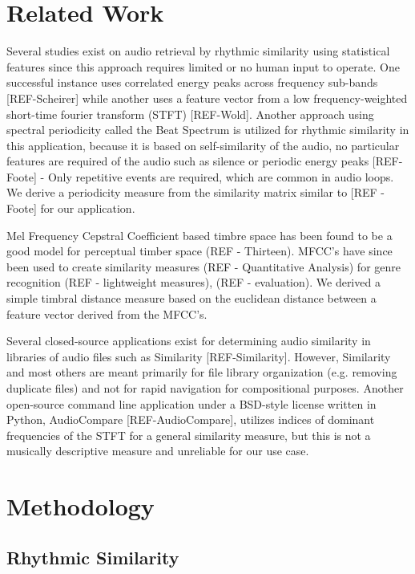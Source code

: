 \documentclass{article}
\begin{document}
\section{Related Work}

Several studies exist on audio retrieval by rhythmic similarity using statistical features since this approach requires limited or no human input to operate. One successful instance uses correlated energy peaks across frequency sub-bands [REF-Scheirer]  while another uses a feature vector from a low frequency-weighted short-time fourier transform (STFT) [REF-Wold]. Another approach using spectral periodicity called the Beat Spectrum is utilized for rhythmic similarity in this application, because it is based on self-similarity of the audio, no particular features are required of the audio such as silence or periodic energy peaks [REF-Foote] - Only repetitive events are required, which are common in audio loops. We derive a periodicity measure from the similarity matrix similar to [REF - Foote] for our application.

Mel Frequency Cepstral Coefficient based timbre space has been found to be a good model for perceptual timber space (REF - Thirteen). MFCC’s have since been used to create similarity measures (REF - Quantitative Analysis) for genre recognition (REF -  lightweight measures), (REF - evaluation). We derived a simple timbral distance measure based on the euclidean distance between a feature vector derived from the MFCC's.

Several closed-source applications exist for determining audio similarity in libraries of audio files such as Similarity [REF-Similarity]. However, Similarity and most others are meant primarily for file library organization (e.g. removing duplicate files) and not for rapid navigation for compositional purposes. Another open-source command line application under a BSD-style license written in Python, AudioCompare [REF-AudioCompare], utilizes indices of dominant frequencies of the STFT for a general similarity measure, but this is not a musically descriptive measure and unreliable for our use case. 


\section{Methodology}

\subsection{Rhythmic Similarity}
\end{document}

